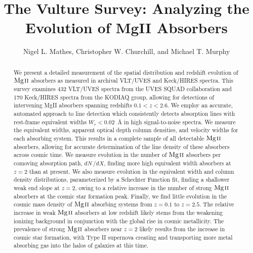 \documentclass[iop,apj,numberedappendix,appendixfloats,twocolappendix]{emulateapj}
\begin{document}
\title{The Vulture Survey: Analyzing the Evolution of MgII Absorbers}

\author{
Nigel L. Mathes,
Christopher W. Churchill,
and
Michael T. Murphy
}


\begin{abstract}
We present a detailed measurement of the spatial distribution and redshift evolution of ${\hbox{{\rm Mg}\kern 0.1em{\sc ii}}}$ absorbers as measured in archival VLT/UVES and Keck/HIRES spectra. This survey examines 432 VLT/UVES spectra from the UVES SQUAD collaboration and 170 Keck/HIRES spectra from the KODIAQ group, allowing for detections of intervening MgII absorbers spanning redshifts $0.1 < z < 2.6$. We employ an accurate, automated approach to line detection which consistently detects absorption lines with rest-frame equivalent widths $W_r < 0.02$~{\AA} in high signal-to-noise spectra. We measure the equivalent widths, apparent optical depth column densities, and velocity widths for each absorbing system. This results in a complete sample of all detectable ${\hbox{{\rm Mg}\kern 0.1em{\sc ii}}}$ absorbers, allowing for accurate determination of the line density of these absorbers across cosmic time. We measure evolution in the number of ${\hbox{{\rm Mg}\kern 0.1em{\sc ii}}}$ absorbers per comoving absorption path, $dN\,/dX$, finding more high equivalent width absorbers at $z = 2$ than at present. We also measure evolution in the equivalent width and column density distributions, parameterized by a Schechter Function fit, finding a shallower weak end slope at $z = 2$, owing to a relative increase in the number of strong ${\hbox{{\rm Mg}\kern 0.1em{\sc ii}}}$ absorbers at the cosmic star formation peak. Finally, we find little evolution in the cosmic mass density of ${\hbox{{\rm Mg}\kern 0.1em{\sc ii}}}$ absorbing systems from $z = 0.1$ to $z = 2.5$. The relative increase in weak ${\hbox{{\rm Mg}\kern 0.1em{\sc ii}}}$ absorbers at low redshift likely stems from the weakening ionizing background in conjunction with the global rise in cosmic metallicity. The prevalence of strong ${\hbox{{\rm Mg}\kern 0.1em{\sc ii}}}$ absorbers near $z = 2$ likely results from the increase in cosmic star formation, with Type II supernova creating and transporting more metal absorbing gas into the halos of galaxies at this time.

\end{abstract}

\end{document}
